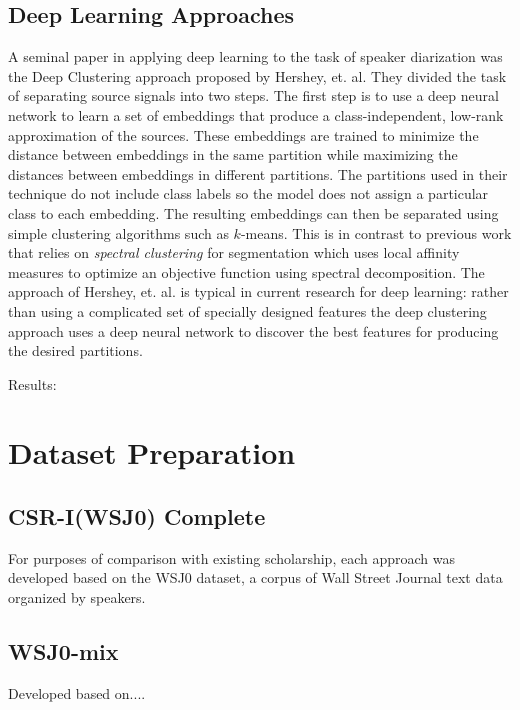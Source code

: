 \documentclass[journal, a4paper]{IEEEtran}
\begin{document}
\subsection{Deep Learning Approaches}

A seminal paper in applying deep learning to the task of speaker diarization was the Deep Clustering \cite{DBLP:journals/corr/HersheyCRW15} approach proposed by Hershey, et. al. They divided the task of separating source signals into two steps. The first step is to use a deep neural network to learn a set of embeddings that produce a class-independent, low-rank approximation of the sources. These embeddings are trained to minimize the distance between embeddings in the same partition while maximizing the distances between embeddings in different partitions. The partitions used in their technique do not include class labels so the model does not assign a particular class to each embedding. The resulting embeddings can then be separated using simple clustering algorithms such as $k$-means. This is in contrast to previous work that relies on \textit{spectral clustering} for segmentation which uses local affinity measures to optimize an objective function using spectral decomposition. The approach of Hershey, et. al. is typical in current research for deep learning: rather than using a complicated set of specially designed features the deep clustering approach uses a deep neural network to discover the best features for producing the desired partitions.

Results:



\section{Dataset Preparation}
\subsection{CSR-I(WSJ0) Complete}
For purposes of comparison with existing scholarship, each approach was developed based on the WSJ0 dataset, a corpus of Wall Street Journal text data organized by speakers.






\subsection{WSJ0-mix}

 
Developed based on...\cite{WSJmix}.
\end{document}
